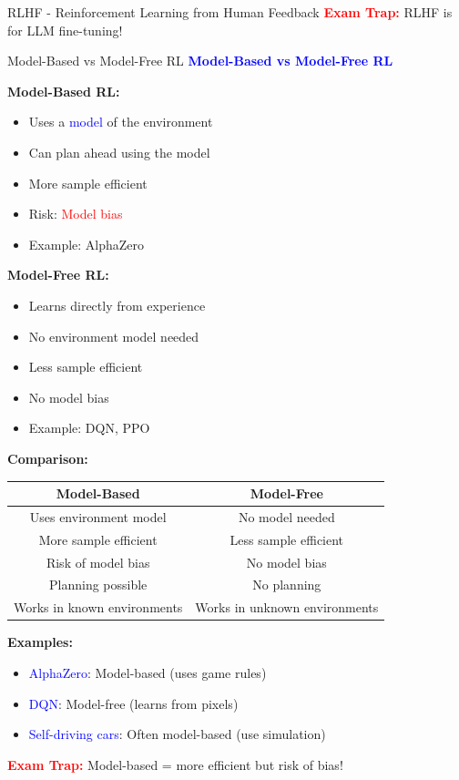 \documentclass[8pt]{beamer}
\begin{document}
\begin{frame}{RLHF - Reinforcement Learning from Human Feedback}
\textcolor{red}{\textbf{Exam Trap:}} RLHF is for LLM fine-tuning!
\end{frame}

\begin{frame}{Model-Based vs Model-Free RL}
\fontsize{6.5}{7.5}\selectfont
\textcolor{blue}{\textbf{Model-Based vs Model-Free RL}}

\textbf{Model-Based RL:}
\begin{itemize}
\item Uses a \textcolor{blue}{model} of the environment
\item Can plan ahead using the model
\item More sample efficient
\item Risk: \textcolor{red}{Model bias}
\item Example: AlphaZero
\end{itemize}

\textbf{Model-Free RL:}
\begin{itemize}
\item Learns directly from experience
\item No environment model needed
\item Less sample efficient
\item No model bias
\item Example: DQN, PPO
\end{itemize}

\textbf{Comparison:}
\begin{tabular}{|c|c|}
\hline
Model-Based & Model-Free \\
\hline
Uses environment model & No model needed \\
\hline
More sample efficient & Less sample efficient \\
\hline
Risk of model bias & No model bias \\
\hline
Planning possible & No planning \\
\hline
Works in known environments & Works in unknown environments \\
\hline
\end{tabular}

\textbf{Examples:}
\begin{itemize}
\item \textcolor{blue}{AlphaZero}: Model-based (uses game rules)
\item \textcolor{blue}{DQN}: Model-free (learns from pixels)
\item \textcolor{blue}{Self-driving cars}: Often model-based (use simulation)
\end{itemize}

\textcolor{red}{\textbf{Exam Trap:}} Model-based = more efficient but risk of bias!
\end{frame}
\end{document}
